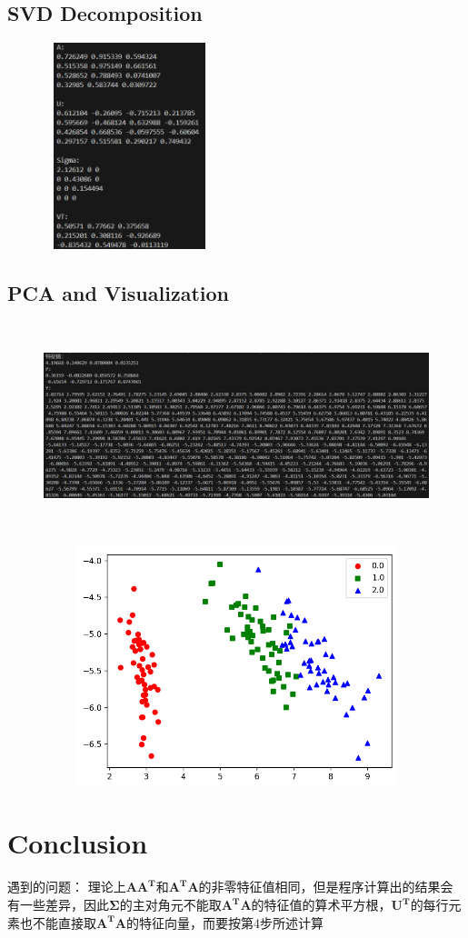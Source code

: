 \documentclass{ctexart}
\begin{document}
	\subsection{SVD Decomposition}
	\begin{figure}[H]
		\centering 
		\includegraphics[height=6cm,width=5cm]{3.png}
		\end{figure}
\subsection{PCA and Visualization}
		\begin{figure}[H]
			\centering 
			\includegraphics[height=6cm,width=14cm]{2.png}
			\end{figure}
			\begin{figure}[H]
				\centering 
				\includegraphics[height=7cm,width=12cm]{1.png}
				\end{figure}
	\section{Conclusion}
	遇到的问题：
	理论上$\mathbf{AA^T}$和$\mathbf{A^TA}$的非零特征值相同，但是程序计算出的结果会有一些差异，因此$\mathbf{\Sigma}$的主对角元不能取$\mathbf{A^TA}$的特征值的算术平方根，$\mathbf{U^T}$的每行元素也不能直接取$\mathbf{A^TA}$的特征向量，而要按第4步所述计算

    
\end{document}
